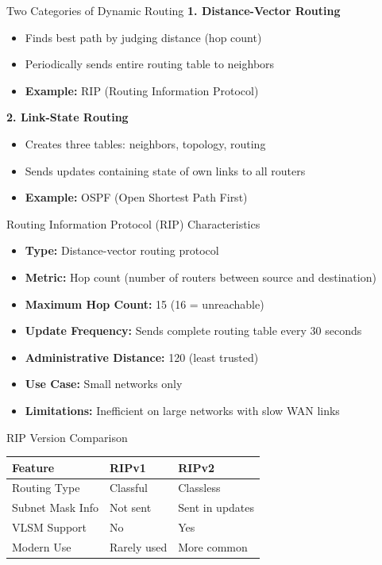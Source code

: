 \documentclass[12pt,a4paper]{article}
\begin{document}
\begin{theorybox}{Two Categories of Dynamic Routing}
\textbf{1. Distance-Vector Routing}
\begin{itemize}[noitemsep]
    \item Finds best path by judging distance (hop count)
    \item Periodically sends entire routing table to neighbors
    \item \textbf{Example:} RIP (Routing Information Protocol)
\end{itemize}

\vspace{0.2cm}
\textbf{2. Link-State Routing}
\begin{itemize}[noitemsep]
    \item Creates three tables: neighbors, topology, routing
    \item Sends updates containing state of own links to all routers
    \item \textbf{Example:} OSPF (Open Shortest Path First)
\end{itemize}
\end{theorybox}

\begin{theorybox}{Routing Information Protocol (RIP) Characteristics}
\begin{itemize}[noitemsep]
    \item \textbf{Type:} Distance-vector routing protocol
    \item \textbf{Metric:} Hop count (number of routers between source and destination)
    \item \textbf{Maximum Hop Count:} 15 (16 = unreachable)
    \item \textbf{Update Frequency:} Sends complete routing table every 30 seconds
    \item \textbf{Administrative Distance:} 120 (least trusted)
    \item \textbf{Use Case:} Small networks only
    \item \textbf{Limitations:} Inefficient on large networks with slow WAN links
\end{itemize}
\end{theorybox}

\begin{theorybox}{RIP Version Comparison}
\begin{center}
\begin{tabular}{lll}
\toprule
\textbf{Feature} & \textbf{RIPv1} & \textbf{RIPv2} \\
\midrule
Routing Type & Classful & Classless \\
Subnet Mask Info & Not sent & Sent in updates \\
VLSM Support & No & Yes \\
Modern Use & Rarely used & More common \\
\bottomrule
\end{tabular}
\end{center}
\end{theorybox}
\end{document}
